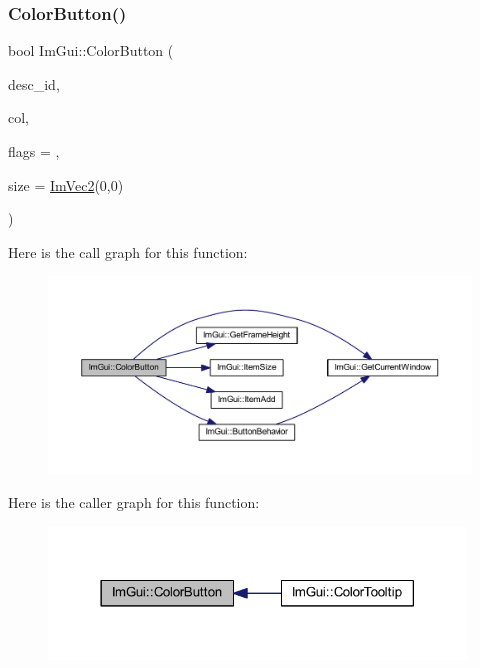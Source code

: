 \subsubsection{\texorpdfstring{Color\+Button()}{ColorButton()}}
{\footnotesize\ttfamily bool Im\+Gui\+::\+Color\+Button (\begin{DoxyParamCaption}\item[{const char $\ast$}]{desc\+\_\+id,  }\item[{const \mbox{\hyperlink{struct_im_vec4}{Im\+Vec4}} \&}]{col,  }\item[{\mbox{\hyperlink{imgui_8h_a6b2d5e95adc38f22c021252189f669c6}{Im\+Gui\+Color\+Edit\+Flags}}}]{flags = {},  }\item[{\mbox{\hyperlink{struct_im_vec2}{Im\+Vec2}}}]{size = {\ttfamily \mbox{\hyperlink{struct_im_vec2}{Im\+Vec2}}(0,0)} }\end{DoxyParamCaption})}

Here is the call graph for this function\+:
\nopagebreak
\begin{figure}[H]
\begin{center}
\leavevmode
\includegraphics[width=350pt]{namespace_im_gui_a82b18bfe08594b76c08894848d1e6fce_cgraph}
\end{center}
\end{figure}
Here is the caller graph for this function\+:
\nopagebreak
\begin{figure}[H]
\begin{center}
\leavevmode
\includegraphics[width=314pt]{namespace_im_gui_a82b18bfe08594b76c08894848d1e6fce_icgraph}
\end{center}
\end{figure}
\mbox{\label{namespace_im_gui_abe2691de0b1a71c774ab24cc91564a94}} 
